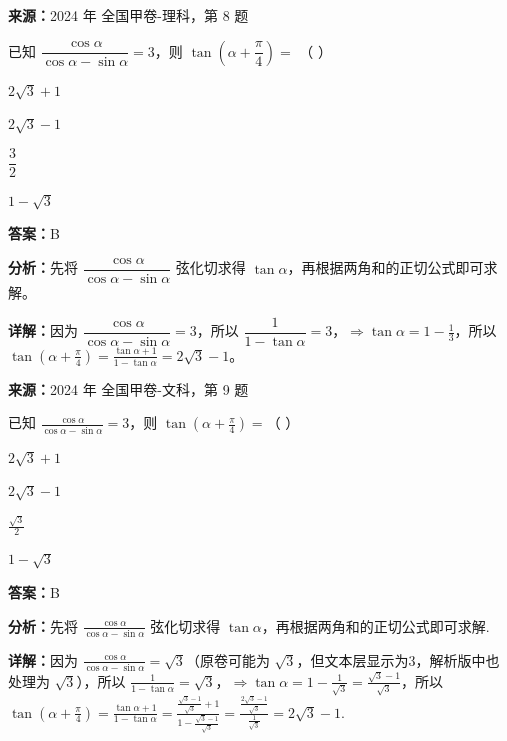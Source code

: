 \begin{question}[points=5]
\textbf{来源：}2024 年 全国甲卷-理科，第 8 题\par
已知 $\dfrac{\cos\alpha}{\cos\alpha-\sin\alpha}=3$，则 $\tan\left(\alpha+\dfrac{\pi}{4}\right)=$ （   ）
\begin{choices}
  \item $2\sqrt{3}+1$
  \item $2\sqrt{3}-1$
  \item $\dfrac{3}{2}$
  \item $1-\sqrt{3}$
\end{choices}
\begin{solution}
\textbf{答案：}B

\textbf{分析：}先将 $\dfrac{\cos\alpha}{\cos\alpha-\sin\alpha}$ 弦化切求得 $\tan\alpha$，再根据两角和的正切公式即可求解。

\textbf{详解：}因为 $\dfrac{\cos\alpha}{\cos\alpha-\sin\alpha}=3$，所以 $\dfrac{1}{1-\tan\alpha}=3$，$\Rightarrow\tan\alpha=1-\frac{1}{3}$，所以 $\tan\left(\alpha+\frac{\pi}{4}\right)=\frac{\tan\alpha+1}{1-\tan\alpha}=2\sqrt{3}-1$。
\end{solution}
\end{question}

\begin{question}[points=5]
\textbf{来源：}2024 年 全国甲卷-文科，第 9 题\par
已知 $\frac{\cos\alpha}{\cos\alpha - \sin\alpha} = 3$，则 $\tan\left(\alpha + \frac{\pi}{4}\right) =$（ ）
\begin{choices}
  \item $2\sqrt{3} + 1$
  \item $2\sqrt{3} - 1$
  \item $\frac{\sqrt{3}}{2}$
  \item $1 - \sqrt{3}$
\end{choices}
\begin{solution}
\textbf{答案：}B

\textbf{分析：}先将 $\frac{\cos\alpha}{\cos\alpha - \sin\alpha}$ 弦化切求得 $\tan\alpha$，再根据两角和的正切公式即可求解.

\textbf{详解：}因为 $\frac{\cos\alpha}{\cos\alpha - \sin\alpha} = \sqrt{3}$（原卷可能为 $\sqrt{3}$，但文本层显示为3，解析版中也处理为 $\sqrt{3}$），所以 $\frac{1}{1 - \tan\alpha} = \sqrt{3}$，$\Rightarrow \tan\alpha = 1 - \frac{1}{\sqrt{3}} = \frac{\sqrt{3} - 1}{\sqrt{3}}$，所以 $\tan\left(\alpha + \frac{\pi}{4}\right) = \frac{\tan\alpha + 1}{1 - \tan\alpha} = \frac{\frac{\sqrt{3} - 1}{\sqrt{3}} + 1}{1 - \frac{\sqrt{3} - 1}{\sqrt{3}}} = \frac{\frac{2\sqrt{3} - 1}{\sqrt{3}}}{\frac{1}{\sqrt{3}}} = 2\sqrt{3} - 1$.
\end{solution}
\end{question}

